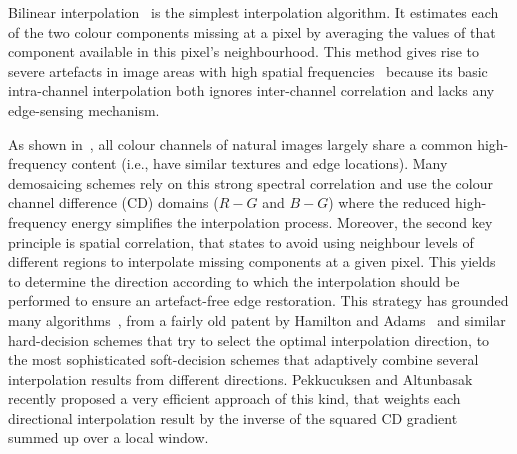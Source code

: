 \documentclass[twoside]{article}
\begin{document}
Bilinear interpolation~\cite{sakamoto_ieeetce_1998} is the simplest interpolation algorithm. It estimates each of the two colour components missing at a pixel by averaging the values of that component available in this pixel's neighbourhood. This method gives rise to severe artefacts in image areas with high spatial frequencies~\cite{chang_jei_2006} because its basic intra-channel interpolation both ignores inter-channel correlation and lacks any edge-sensing mechanism.

As shown in~\cite{gunturk_ip_2002}, all colour channels of natural images largely share a common high-frequency content (i.e., have similar textures and edge locations). Many demosaicing schemes rely on this strong spectral correlation and use the colour channel difference (CD) domains ($R-G$ and $B-G$) where the reduced high-frequency energy simplifies the interpolation process. Moreover, the second key principle is spatial correlation, that states to avoid using neighbour levels of different regions to interpolate missing components at a given pixel. This yields to determine the direction according to which the interpolation should be performed to ensure an artefact-free edge restoration. This strategy has grounded many algorithms~\cite{menon_ic_2011}, from a fairly old patent by Hamilton and Adams~\cite{hamilton_patent_1997} and similar hard-decision schemes that try to select the optimal interpolation direction, to the most sophisticated soft-decision schemes that adaptively combine several interpolation results from different directions. Pekkucuksen and Altunbasak~\cite{pekkucuksen_ip_2013} recently proposed a very efficient approach of this kind, that weights each directional interpolation result by the inverse of the squared CD gradient summed up over a local window.
\end{document}
